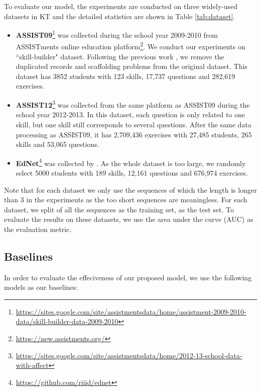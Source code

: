 \documentclass[runningheads]{llncs}
\begin{document}
To evaluate our model, the experiments are conducted on three widely-used datasets in KT and the detailed statistics are shown in Table \ref{tab:dataset}.
\begin{itemize}
	\item \textbf{ASSIST09}\footnote{\url{https://sites.google.com/site/assistmentsdata/home/assistment-2009-2010-data/skill-builder-data-2009-2010}} was collected during the school year 2009-2010 from ASSISTments online education  platform\footnote{\url{https://new.assistments.org/}}. We conduct our experiments on ``skill-builder" dataset. Following the previous work \cite{xiong2016going}, we remove the duplicated records and scaffolding problems from the original dataset. This dataset has 3852 students with 123 skills, 17,737 questions and 282,619 exercises. 

	\item \textbf{ASSIST12}\footnote{\url{https://sites.google.com/site/assistmentsdata/home/2012-13-school-data-with-affect}} was collected from the same platform as ASSIST09 during the school year 2012-2013. In this dataset, each question is only related to one skill, but one skill still corresponds to several questions. After the same data processing as ASSIST09, it has 2,709,436 exercises with 27,485 students, 265 skills and 53,065 questions.
	
	\item \textbf{EdNet}\footnote{\url{https://github.com/riiid/ednet}} was collected by \cite{choi2019ednet}. As the whole dataset is too large, we randomly select 5000 students with 189 skills, 12,161 questions and 676,974 exercises.
	




	
\end{itemize}

Note that for each dataset we only use the sequences of which the length is longer than 3 in the experiments as the too short sequences are meaningless. For each dataset, we split  of all the sequences as the training set,  as the test set. To evaluate the results on these datasets, we use the area under the curve (AUC) as the evaluation metric. 


\subsection{Baselines}
In order to evaluate the effeciveness of our proposed model, we use the following models as our baselines:
\end{document}
